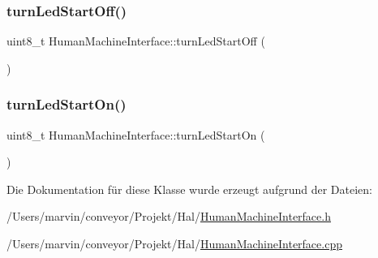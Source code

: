 \subsubsection{\texorpdfstring{turn\+Led\+Start\+Off()}{turnLedStartOff()}}
{\footnotesize\ttfamily uint8\+\_\+t Human\+Machine\+Interface\+::turn\+Led\+Start\+Off (\begin{DoxyParamCaption}{ }\end{DoxyParamCaption})}

\hypertarget{class_human_machine_interface_a46dca7b3435dc4b20a2db67b301cb36d}{}\label{class_human_machine_interface_a46dca7b3435dc4b20a2db67b301cb36d} 
\subsubsection{\texorpdfstring{turn\+Led\+Start\+On()}{turnLedStartOn()}}
{\footnotesize\ttfamily uint8\+\_\+t Human\+Machine\+Interface\+::turn\+Led\+Start\+On (\begin{DoxyParamCaption}{ }\end{DoxyParamCaption})}



Die Dokumentation für diese Klasse wurde erzeugt aufgrund der Dateien\+:\begin{DoxyCompactItemize}
\item 
/\+Users/marvin/conveyor/\+Projekt/\+Hal/\hyperlink{_human_machine_interface_8h}{Human\+Machine\+Interface.\+h}\item 
/\+Users/marvin/conveyor/\+Projekt/\+Hal/\hyperlink{_human_machine_interface_8cpp}{Human\+Machine\+Interface.\+cpp}\end{DoxyCompactItemize}
